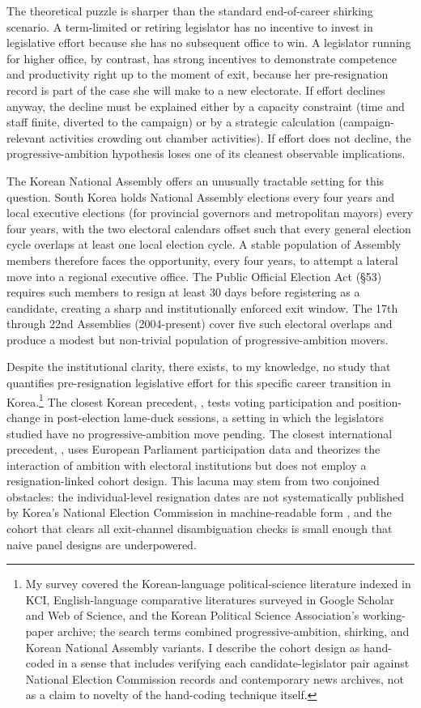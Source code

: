 \documentclass[11pt]{article}
\begin{document}
The theoretical puzzle is sharper than the standard end-of-career shirking scenario. A term-limited or retiring legislator has no incentive to invest in legislative effort because she has no subsequent office to win. A legislator running for higher office, by contrast, has strong incentives to demonstrate competence and productivity right up to the moment of exit, because her pre-resignation record is part of the case she will make to a new electorate. If effort declines anyway, the decline must be explained either by a capacity constraint (time and staff finite, diverted to the campaign) or by a strategic calculation (campaign-relevant activities crowding out chamber activities). If effort does not decline, the progressive-ambition hypothesis loses one of its cleanest observable implications.

The Korean National Assembly offers an unusually tractable setting for this question. South Korea holds National Assembly elections every four years and local executive elections (for provincial governors and metropolitan mayors) every four years, with the two electoral calendars offset such that every general election cycle overlaps at least one local election cycle. A stable population of Assembly members therefore faces the opportunity, every four years, to attempt a lateral move into a regional executive office. The Public Official Election Act (\S 53) requires such members to resign at least 30 days before registering as a candidate, creating a sharp and institutionally enforced exit window. The 17th through 22nd Assemblies (2004-present) cover five such electoral overlaps and produce a modest but non-trivial population of progressive-ambition movers.

Despite the institutional clarity, there exists, to my knowledge, no study that quantifies pre-resignation legislative effort for this specific career transition in Korea.\footnote{My survey covered the Korean-language political-science literature indexed in KCI, English-language comparative literatures surveyed in Google Scholar and Web of Science, and the Korean Political Science Association's working-paper archive; the search terms combined progressive-ambition, shirking, and Korean National Assembly variants. I describe the cohort design as hand-coded in a sense that includes verifying each candidate-legislator pair against National Election Commission records and contemporary news archives, not as a claim to novelty of the hand-coding technique itself.} The closest Korean precedent, \citet{koo2018}, tests voting participation and position-change in post-election lame-duck sessions, a setting in which the legislators studied have no progressive-ambition move pending. The closest international precedent, \citet{hoyland2017}, uses European Parliament participation data and theorizes the interaction of ambition with electoral institutions but does not employ a resignation-linked cohort design. This lacuna may stem from two conjoined obstacles: the individual-level resignation dates are not systematically published by Korea's National Election Commission in machine-readable form \citep{hwang2025}, and the cohort that clears all exit-channel disambiguation checks is small enough that naive panel designs are underpowered.
\end{document}
